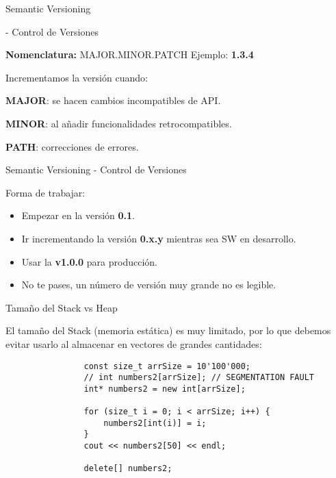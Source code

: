 \documentclass{beamer}
\newcommand{\normalSizeItem}[1] {
  \normalsize{\item #1}
}
\newcommand{\smallCite}[1]{
	\begin{small}
		\cite{#1}	
	\end{small}
}
\begin{document}
		\begin{frame}[fragile]{Semantic Versioning \smallCite{semanticVersioning} - Control de Versiones}	
			
			\textbf{Nomenclatura:} MAJOR.MINOR.PATCH
			\newline\newline
			Ejemplo: \textbf{1.3.4}
		
			Incrementamos la versión cuando:
			\begin{itemize}

				\normalSizeItem { \textbf{MAJOR}: se hacen cambios incompatibles de API.}
				\normalSizeItem { \textbf{MINOR}: al añadir funcionalidades retrocompatibles.}
				\normalSizeItem { \textbf{PATH}: correcciones de errores.}
			\end{itemize}
		\end{frame}
		
		\begin{frame}[fragile]{Semantic Versioning - Control de Versiones}	
			
			Forma de trabajar:
			\begin{itemize}
				\item Empezar en la versión \textbf{0.1}.
				\item Ir incrementando la versión \textbf{0.x.y }mientras sea SW en desarrollo.
				\item Usar la \textbf{v1.0.0} para producción.
				\item No te pases, un número de versión muy grande no es legible.
			\end{itemize}
		\end{frame}
		
		\begin{frame}[fragile]{Tamaño del Stack vs Heap}	
			
			El tamaño del Stack (memoria estática) es muy limitado, por lo que debemos evitar usarlo al almacenar en vectores de grandes cantidades:

			\begin{lstlisting}
				const size_t arrSize = 10'100'000;
				// int numbers2[arrSize]; // SEGMENTATION FAULT
				int* numbers2 = new int[arrSize];
				
				for (size_t i = 0; i < arrSize; i++) {
					numbers2[int(i)] = i;
				}
				cout << numbers2[50] << endl;
				
				delete[] numbers2;
				\end{lstlisting}
		\end{frame}
		
\end{document}
